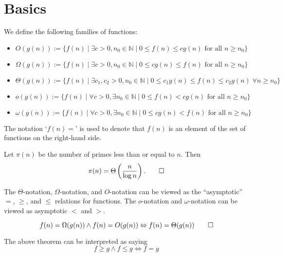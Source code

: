 \section{Basics}
\begin{definition}
We define the following families of functions:
\begin{itemize}%
    \item $O(g(n)) := \{ f(n) \mid \exists c > 0, n_0 \in \mathbb{N} \mid0 \leq f(n) \leq cg(n) \text{ for all } n \geq n_0 \}$
    \item $\Omega(g(n)) := \{ f(n) \mid \exists c > 0, n_0 \in \mathbb{N} \mid 0 \leq cg(n) \leq f(n) \text{ for all } n \geq n_0 \}$
    \item $\Theta(g(n)) := \{ f(n) \mid \exists c_1, c_2 > 0, n_0 \in \mathbb{N} \mid 0 \leq c_1g(n) \leq f(n) \leq c_2g(n) \; \forall n \geq n_0 \}$
    \item $o(g(n)) := \{ f(n) \mid \forall c > 0, \exists n_0 \in \mathbb{N} \mid 0 \leq f(n) < cg(n) \text{ for all } n \geq n_0 \}$
    \item $\omega(g(n)) := \{ f(n) \mid \forall c > 0, \exists n_0 \in \mathbb{N} \mid 0 \leq cg(n) < f(n) \text{ for all } n \geq n_0 \}$ \qedhere
\end{itemize}
\end{definition}



The notation `$f(n) =$' is used to denote that $f(n)$ is an element of the set of functions on the right-hand side.
\begin{example}
    Let $\pi(n)$ be the number of primes less than or equal to $n$. Then 
    \[
    \pi(n) = \Theta\left(\frac{n}{\log n}\right)
    \text{.} \qedhere
    \]
\end{example}

The $\Theta$-notation, $\Omega$-notation, and $O$-notation can be viewed as the ``asymptotic'' $=$, $\geq$, and $\leq$ relations for functions.
The $o$-notation and $\omega$-notation can be viewed as asymptotic $<$ and $>$.



\begin{theorem}
    \label{thm:O-and-Omega-imply-Theta}
    \leavevmode\setlength{\abovedisplayskip}{0pt}\vspace{-\baselineskip}
    \[
    f(n) = \Omega(g(n)) \wedge f(n) = O(g(n)) \Leftrightarrow f(n) = \Theta(g(n))
    \qedhere
    \]
\end{theorem}
The above theorem can be interpreted as saying
\[
f \geq g \wedge f \leq g \Leftrightarrow f = g
\] 

